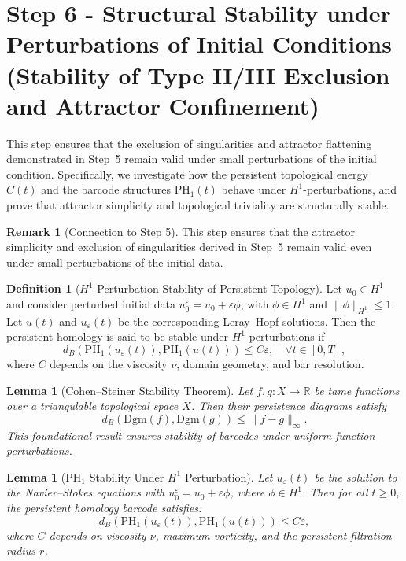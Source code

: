 \documentclass[11pt]{article}
\newtheorem{lemma}[theorem]{Lemma}
\theoremstyle{definition}
\newtheorem{definition}[theorem]{Definition}
\newtheorem{remark}[theorem]{Remark}
\begin{document}
\section{Step 6 - Structural Stability under Perturbations of Initial Conditions\\
\small (Stability of Type II/III Exclusion and Attractor Confinement)}
\label{sec:step6}

This step ensures that the exclusion of singularities and attractor flattening demonstrated in Step~5 remain valid under small perturbations of the initial condition. Specifically, we investigate how the persistent topological energy $C(t)$ and the barcode structures $\mathrm{PH}_1(t)$ behave under $H^1$-perturbations, and prove that attractor simplicity and topological triviality are structurally stable.

\begin{remark}[Connection to Step 5]
This step ensures that the attractor simplicity and exclusion of singularities derived in Step~5 remain valid even under small perturbations of the initial data.
\end{remark}

\begin{definition}[$H^1$-Perturbation Stability of Persistent Topology]
Let $u_0 \in H^1$ and consider perturbed initial data $u_0^\varepsilon = u_0 + \varepsilon \phi$, with $\phi \in H^1$ and $\|\phi\|_{H^1} \le 1$. Let $u(t)$ and $u_\varepsilon(t)$ be the corresponding Leray--Hopf solutions. Then the persistent homology is said to be stable under $H^1$ perturbations if
\[
d_B(\mathrm{PH}_1(u_\varepsilon(t)), \mathrm{PH}_1(u(t))) \le C \varepsilon, \quad \forall t \in [0, T],
\]
where $C$ depends on the viscosity $\nu$, domain geometry, and bar resolution.
\end{definition}

\begin{lemma}[Cohen--Steiner Stability Theorem]
Let $f, g : X \to \mathbb{R}$ be tame functions over a triangulable topological space $X$. Then their persistence diagrams satisfy
\[
d_B(\mathrm{Dgm}(f), \mathrm{Dgm}(g)) \le \|f - g\|_\infty.
\]
This foundational result ensures stability of barcodes under uniform function perturbations.
\end{lemma}

\begin{lemma}[PH$_1$ Stability Under $H^1$ Perturbation]
Let $u_\varepsilon(t)$ be the solution to the Navier--Stokes equations with $u_0^\varepsilon = u_0 + \varepsilon \phi$, where $\phi \in H^1$. Then for all $t \ge 0$, the persistent homology barcode satisfies:
\[
d_B(\mathrm{PH}_1(u_\varepsilon(t)), \mathrm{PH}_1(u(t))) \le C \varepsilon,
\]
where $C$ depends on viscosity $\nu$, maximum vorticity, and the persistent filtration radius $r$.
\end{lemma}
\end{document}
